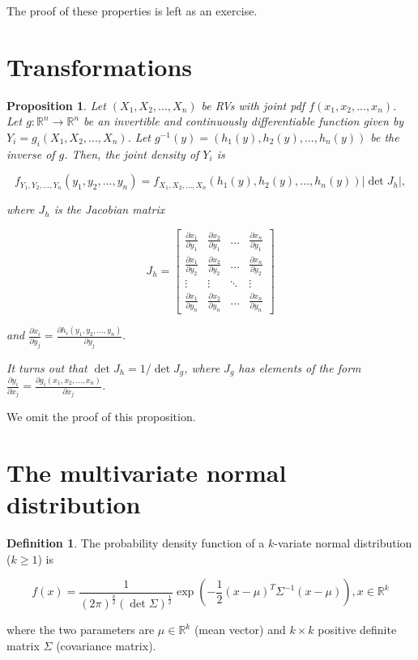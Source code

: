 \documentclass{book}
\theoremstyle{plain}%
\newtheorem{proposition}{Proposition}[section]
\theoremstyle{definition}
\newtheorem{definition}{Definition}[section]
\newlength{\arrow}
\newcommand{\pder}[2]{\frac{\partial #1}{\partial #2}}
\begin{document}
The proof of these properties is left as an exercise.

\section{Transformations}

\begin{proposition}
Let $(X_1,X_2,...,X_n)$ be RVs with joint pdf $f(x_1,x_2,...,x_n)$. Let $g: \mathbb{R}^n \rightarrow \mathbb{R}^n$ be an invertible and continuously differentiable function given by $Y_i = g_i(X_1, X_2, ..., X_n)$. Let $g^{-1}(y) = (h_1(y), h_2(y),..., h_n(y))$ be the inverse of $g$. Then, the joint density of $Y_i$ is

$$f_{Y_1,Y_2,...,Y_n}(y_1,y_2,...,y_n) = f_{X_1,X_2,...,X_n}(h_1(y), h_2(y),..., h_n(y))|\det J_h|,$$

where $J_h$ is the Jacobian matrix

$$J_h = \begin{bmatrix}
\pder{x_1}{y_1} & \pder{x_2}{y_1} & \dots & \pder{x_n}{y_1} \\[1ex]
\pder{x_1}{y_2} & \pder{x_2}{y_2} & \dots & \pder{x_n}{y_2} \\
\vdots & \vdots & \ddots & \vdots \\[1ex]
\pder{x_1}{y_n} & \pder{x_2}{y_n} & \dots & \pder{x_n}{y_n}
\end{bmatrix}$$

and $\pder{x_i}{y_j} = \pder{h_i(y_1,y_2,...,y_n)}{y_j}.$

It turns out that $\det J_h = 1/\det J_g$, where $J_g$ has elements of the form $\pder{y_i}{x_j} = \pder{g_i(x_1,x_2,...,x_n)}{x_j}$.\label{prop:changeofvar}
\end{proposition}

We omit the proof of this proposition.

\section{The multivariate normal distribution}

\begin{definition}
The probability density function of a $k$-variate normal distribution ($k \geq 1$) is

$$f(x) = \frac{1}{(2\pi)^\frac{k}{2}(\det\Sigma)^\frac{1}{2}} \exp\left(-\frac{1}{2}(x-\mu)^T\Sigma^{-1}(x - \mu)\right), x \in \mathbb{R}^k$$

where the two parameters are $\mu \in \mathbb{R}^k$ (mean vector) and $k \times k$ positive definite matrix $\Sigma$ (covariance matrix).
\end{definition}
\end{document}
